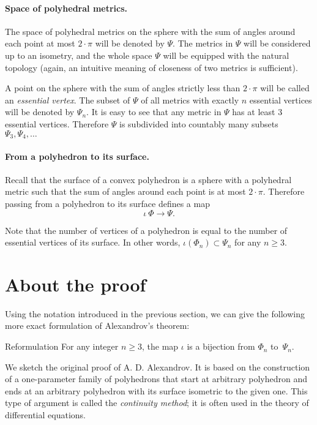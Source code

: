 \documentclass[oneside,a4paper]{article}
\begin{document}
\paragraph{Space of polyhedral metrics.}
The space of polyhedral metrics on the sphere with the sum of angles around each point at most $2\cdot\pi$ will be denoted by $\Psi$.
The metrics in $\Psi$ will be considered up to an isometry, and the whole space $\Psi$ will be equipped with the natural topology (again, an intuitive meaning of closeness of two metrics is sufficient).

A point on the sphere with the sum of angles strictly less than $2\cdot\pi$ will be called an \emph{essential vertex}.
The subset of $\Psi$ of all metrics with exactly $n$ essential vertices will be denoted by $\Psi_n$.
It is easy to see that any metric in $\Psi$ has at least 3 essential vertices.
Therefore $\Psi$ is subdivided into countably many subsets
 $\Psi_3,\Psi_4,\dots$

\paragraph{From a polyhedron to its surface.}

Recall that the surface of a convex polyhedron is a sphere with a polyhedral metric such that the sum of angles around each point is at most $2\cdot\pi$.
Therefore passing from a polyhedron to its surface defines a map
\[\iota\:\Phi\to \Psi.\]

Note that the number of vertices of a polyhedron is equal to the number of essential vertices of its surface.
In other words, $\iota(\Phi_n)\subset \Psi_n$ for any $n\ge 3$.

\section{About the proof}

Using the notation introduced in the previous section, we can give the following more exact formulation of Alexandrov's theorem: 

\begin{thm}{Reformulation}
For any integer $n\ge 3$,
the map $\iota$ is a bijection from $\Phi_n$ to~$\Psi_n$.
\end{thm}

We sketch the original proof of A. D. Alexandrov.
It is based on the  construction of a one-parameter family of polyhedrons that start at arbitrary polyhedron
and ends at an arbitrary polyhedron with its surface isometric to the given one.
This type of argument is called the \emph{continuity method}; it is often used in the theory of differential equations.
\end{document}
